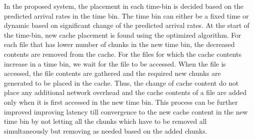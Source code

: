 
In the proposed system, the placement in each time-bin is decided based on the predicted arrival rates in the time bin. The time bin can either be a fixed time or dynamic based on significant change of the predicted arrival rates. At the start of the time-bin, new cache placement is found using the optimized algorithm. For each file that has lower number of chunks in the new time bin, the decreased contents are removed from the cache. For the files for which the cache contents increase in a time bin, we wait for the file to be accessed. When the file is accessed,  the file contents are gathered and the required new chunks are generated to be placed in the cache. Thus, the change of cache content do not place any additional network overhead and the cache contents of a file are added only when it is first accessed in the new time bin. This process can be further improved improving latency till convergence to the new cache content in the new time bin by not letting all the chunks which have to be removed all simultaneously but removing as needed based on the added chunks.